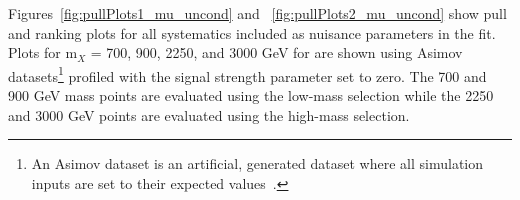
Figures~\ref{fig:pullPlots1_mu_uncond} and ~\ref{fig:pullPlots2_mu_uncond} show pull and ranking plots for all systematics included as nuisance parameters in the fit. Plots for m$_X$ = 700, 900, 2250, and 3000 GeV for are shown using Asimov datasets\footnote{An Asimov dataset is an artificial, generated dataset where all simulation inputs are set to their expected values~\cite{Cowan:2010js}.} profiled with the signal strength parameter set to zero. The 700 and 900 GeV mass points are evaluated using the low-mass selection while the 2250 and 3000 GeV points are evaluated using the high-mass selection. %

